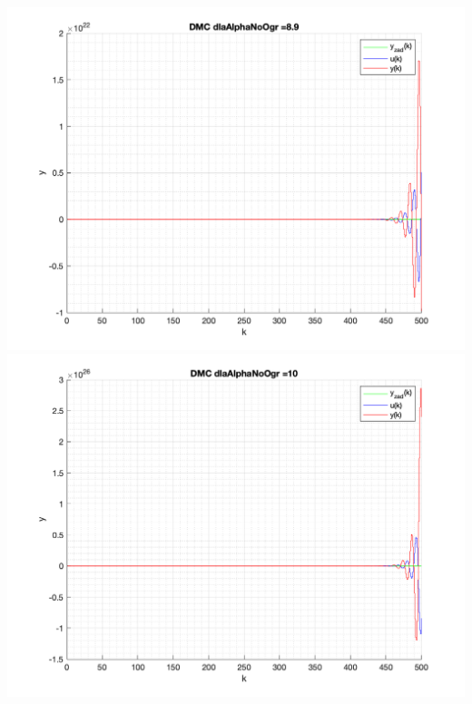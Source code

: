 \documentclass[a4paper, 11pt]{article}
\begin{document}
\begin{enumerate}
 \includegraphics[width=\linewidth]{./ModelsDodatkowe_AlphaNoOgr/P4_DMC_AlphaNoOgr_8_9_png.png} 
 \includegraphics[width=\linewidth]{./ModelsDodatkowe_AlphaNoOgr/P4_DMC_AlphaNoOgr_10_png.png} 
\end{enumerate}
\end{document}
